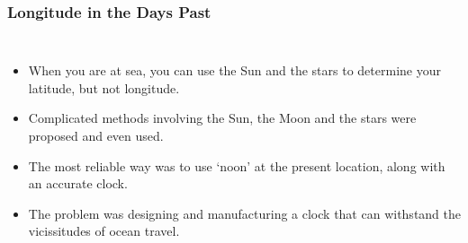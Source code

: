 \begin{frame}
\frametitle{Longitude in the Days Past}
\begin{columns}
\begin{itemize} 
\item When you are at sea, you can use the Sun and the stars to determine your latitude, but not longitude.
\item Complicated methods involving the Sun, the Moon and the stars were proposed and even used.
\item The most reliable way was to use `noon' at the present location, along with an accurate clock.
\item The problem was designing and manufacturing a clock that can withstand the vicissitudes of ocean travel.
\end{itemize}
\end{columns}
\end{frame}

